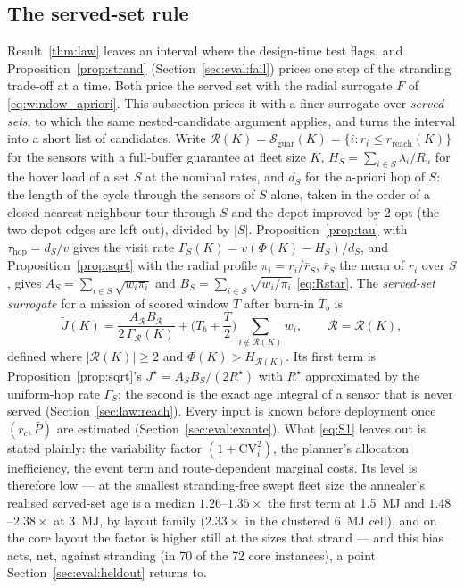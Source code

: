 \documentclass[journal,outdir=./]{IEEEtran}
\newcommand{\rc}{r_{c}}
\newcommand{\Pbar}{\bar{P}}
\newcommand{\Gam}{\Gamma}
\newcommand{\Ru}{R_u}
\begin{document}
\subsection{The served-set rule}\label{sec:law:served}
Result~\ref{thm:law} leaves an interval where the design-time test flags, and Proposition~\ref{prop:strand} (Section~\ref{sec:eval:fail}) prices one step of the stranding trade-off at a time. Both price the served set with the radial surrogate $F$ of \eqref{eq:window_apriori}. This subsection prices it with a finer surrogate over \emph{served sets}, to which the same nested-candidate argument applies, and turns the interval into a short list of candidates. Write $\mathcal{R}(K)=\mathcal{S}_{\mathrm{guar}}(K)=\{i:r_i\le r_{\mathrm{reach}}(K)\}$ for the sensors with a full-buffer guarantee at fleet size $K$, $H_S=\sum_{i\in S}\lambda_i/\Ru$ for the hover load of a set $S$ at the nominal rates, and $d_S$ for the a-priori hop of $S$: the length of the cycle through the sensors of $S$ alone, taken in the order of a closed nearest-neighbour tour through $S$ and the depot improved by 2-opt (the two depot edges are left out), divided by $|S|$. Proposition~\ref{prop:tau} with $\tau_{\mathrm{hop}}=d_S/v$ gives the visit rate $\Gam_S(K)=v(\Phi(K)-H_S)/d_S$, and Proposition~\ref{prop:sqrt} with the radial profile $\pi_i=r_i/\bar r_S$, $\bar r_S$ the mean of $r_i$ over $S$, gives $A_S=\sum_{i\in S}\sqrt{w_i\pi_i}$ and $B_S=\sum_{i\in S}\sqrt{w_i/\pi_i}$ \eqref{eq:Rstar}. The \emph{served-set surrogate} for a mission of scored window $T$ after burn-in $T_b$ is
\begin{equation}\label{eq:S1}
\tilde J(K)=\frac{A_{\mathcal R}B_{\mathcal R}}{2\,\Gam_{\mathcal R}(K)}+\Big(T_b+\frac T2\Big)\!\!\sum_{i\notin\mathcal{R}(K)}\!\!w_i,\qquad \mathcal R=\mathcal R(K),
\end{equation}
defined where $|\mathcal R(K)|\ge2$ and $\Phi(K)>H_{\mathcal R(K)}$. Its first term is Proposition~\ref{prop:sqrt}'s $J^{\star}=A_SB_S/(2R^{\star})$ with $R^{\star}$ approximated by the uniform-hop rate $\Gam_S$; the second is the exact age integral of a sensor that is never served (Section~\ref{sec:law:reach}). Every input is known before deployment once $(\rc,\Pbar)$ are estimated (Section~\ref{sec:eval:exante}). What \eqref{eq:S1} leaves out is stated plainly: the variability factor $(1+\mathrm{CV}_i^2)$, the planner's allocation inefficiency, the event term and route-dependent marginal costs. Its level is therefore low --- at the smallest stranding-free swept fleet size the annealer's realised served-set age is a median $1.26$--$1.35\times$ the first term at 1.5~MJ and $1.48$--$2.38\times$ at 3~MJ, by layout family ($2.33\times$ in the clustered 6~MJ cell), and on the core layout the factor is higher still at the sizes that strand --- and this bias acts, net, against stranding (in 70 of the 72 core instances), a point Section~\ref{sec:eval:heldout} returns to.
\end{document}
